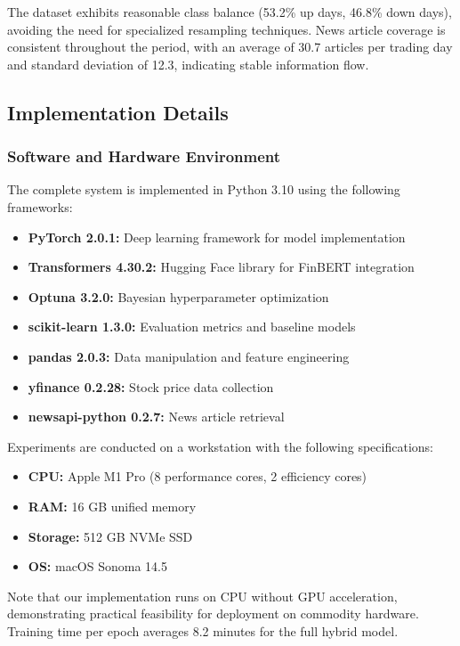 \documentclass[conference]{IEEEtran}
\begin{document}
The dataset exhibits reasonable class balance (53.2\% up days, 46.8\% down days), avoiding the need for specialized resampling techniques. News article coverage is consistent throughout the period, with an average of 30.7 articles per trading day and standard deviation of 12.3, indicating stable information flow.

\subsection{Implementation Details}

\subsubsection{Software and Hardware Environment}
The complete system is implemented in Python 3.10 using the following frameworks:

\begin{itemize}
\item \textbf{PyTorch 2.0.1:} Deep learning framework for model implementation
\item \textbf{Transformers 4.30.2:} Hugging Face library for FinBERT integration
\item \textbf{Optuna 3.2.0:} Bayesian hyperparameter optimization
\item \textbf{scikit-learn 1.3.0:} Evaluation metrics and baseline models
\item \textbf{pandas 2.0.3:} Data manipulation and feature engineering
\item \textbf{yfinance 0.2.28:} Stock price data collection
\item \textbf{newsapi-python 0.2.7:} News article retrieval
\end{itemize}

Experiments are conducted on a workstation with the following specifications:
\begin{itemize}
\item \textbf{CPU:} Apple M1 Pro (8 performance cores, 2 efficiency cores)
\item \textbf{RAM:} 16 GB unified memory
\item \textbf{Storage:} 512 GB NVMe SSD
\item \textbf{OS:} macOS Sonoma 14.5
\end{itemize}

Note that our implementation runs on CPU without GPU acceleration, demonstrating practical feasibility for deployment on commodity hardware. Training time per epoch averages 8.2 minutes for the full hybrid model.
\end{document}
